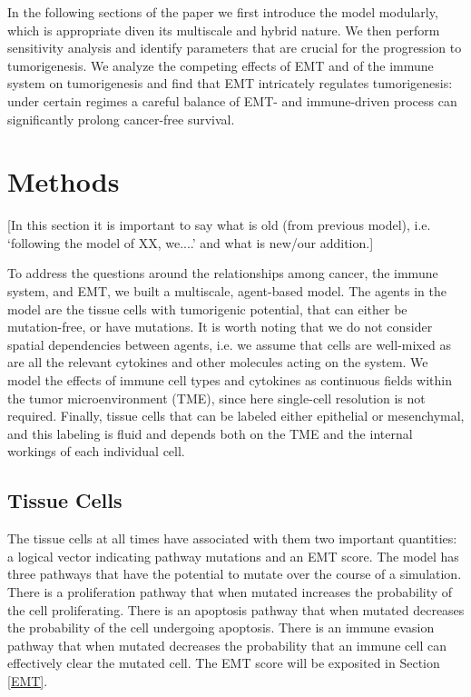 \documentclass{article}
\begin{document}
In the following sections of the paper we first introduce the model modularly, which is appropriate diven its multiscale and hybrid nature. We then perform sensitivity analysis and identify parameters that are crucial for the progression to tumorigenesis. We analyze the competing effects of EMT and of the immune system on tumorigenesis and find that EMT intricately regulates tumorigenesis: under certain regimes a careful balance of EMT- and immune-driven process can significantly prolong cancer-free survival.   





\section{Methods}
[In this section it is important to say what is old (from previous model), i.e. `following the model of XX, we....' and what is new/our addition.]

To address the questions around the relationships among cancer, the immune system, and EMT, we built a multiscale, agent-based model.
The agents in the model are the tissue cells with tumorigenic potential, that can either be mutation-free, or have mutations.
It is worth noting that we do not consider spatial dependencies between agents, i.e. we assume that cells are well-mixed as are all the relevant cytokines and other molecules acting on the system.
We model the effects of immune cell types and cytokines as continuous fields within the tumor microenvironment (TME), since here single-cell resolution is not required. 
Finally, tissue cells that can be labeled either epithelial or mesenchymal, and this labeling is fluid and depends both on the TME and the internal workings of each individual cell.

\subsection{Tissue Cells}\label{TissueCells}
The tissue cells at all times have associated with them two important quantities: a logical vector indicating pathway mutations and an EMT score.
The model has three pathways that have the potential to mutate over the course of a simulation.
There is a proliferation pathway that when mutated increases the probability of the cell proliferating.
There is an apoptosis pathway that when mutated decreases the probability of the cell undergoing apoptosis.
There is an immune evasion pathway that when mutated decreases the probability that an immune cell can effectively clear the mutated cell.
The EMT score will be exposited in Section \ref{EMT}.
\end{document}
